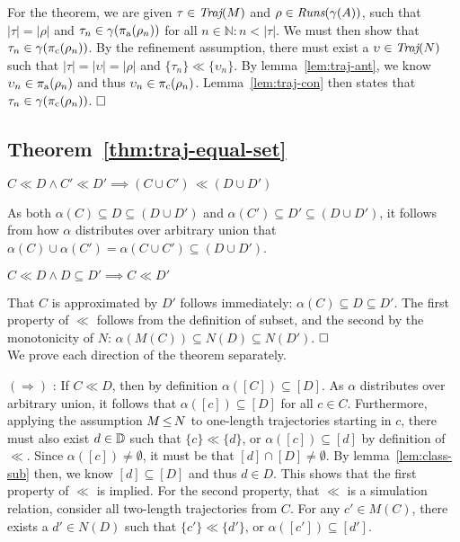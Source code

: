 
For the theorem, we are given $\tau \in \operatorname{\textit{Traj}}(M)$ and $\rho \in \operatorname{\textit{Runs}}(\gamma(A))$, such that $| \tau | = | \rho |$ and $\tau_{n} \in \gamma(\operatorname{\pi_{\textrm{a}}}(\rho_{n}))$ for all $n \in \mathbb{N} : n < | \tau |$. We must then show that $\tau_{n} \in \gamma(\operatorname{\pi_{\textrm{c}}}(\rho_{n}))$. By the refinement assumption, there must exist a $\upsilon \in \operatorname{\textit{Traj}}(N)$ such that $| \tau | = | \upsilon | = | \rho |$ and $\{ \tau_{n} \} \ll \{ \upsilon_{n} \}$. By lemma~\ref{lem:traj-ant}, we know $\upsilon_{n} \in \operatorname{\pi_{\textrm{a}}}(\rho_{n})$ and thus $\upsilon_{n} \in \operatorname{\pi_{\textrm{c}}}(\rho_{n})$. Lemma~\ref{lem:traj-con} then states that $\tau_{n} \in \gamma(\operatorname{\pi_{\textrm{c}}}(\rho_{n}))$. $\qedbox$

\subsection{Theorem~\ref{thm:traj-equal-set}}

\begin{lemma} \label{lem:name2}
$C \ll D \wedge C' \ll D' \implies (C \cup C') \, \ll (D \cup D')$
\end{lemma}

As both $\alpha(C) \subseteq D \subseteq (D \cup D')$ and $\alpha(C') \subseteq D' \subseteq (D \cup D')$, it follows from how $\alpha$ distributes over arbitrary union that $\alpha(C) \cup \alpha(C') = \alpha(C \cup C') \subseteq (D \cup D')$. \todo{\dots}

\begin{lemma} \label{lem:name1}
$C \ll D \wedge D \subseteq D' \implies C \ll D'$
\end{lemma}

That $C$ is approximated by $D'$ follows immediately: $\alpha(C) \subseteq D \subseteq D'$. The first property of $\ll$ follows from the definition of subset, and the second by the monotonicity of $N$: $\alpha(M(C)) \subseteq N(D) \subseteq N(D')$. $\qedbox$
\\

We prove each direction of the theorem separately.

$(\Rightarrow)$ : If $C \ll D$, then by definition $\alpha([C]) \subseteq [D]$. As $\alpha$ distributes over arbitrary union, it follows that $\alpha([c]) \subseteq [D]$ for all $c \in C$. Furthermore, applying the assumption $M \operatorname{\leq} N$ to one-length trajectories starting in $c$, there must also exist $d \in \mathbb{D}$ such that $\{ c \} \ll \{ d \}$, or $\alpha([c]) \subseteq [d]$ by definition of $\ll$. Since $\alpha([c]) \neq \emptyset$, it must be that $[d] \cap [D] \neq \emptyset$. By lemma~\ref{lem:class-sub} then, we know $[d] \subseteq [D]$ and thus $d \in D$. This shows that the first property of $\ll$ is implied. For the second property, that $\ll$ is a simulation relation, consider all two-length trajectories from $C$. For any $c' \in M(C)$, there exists a $d' \in N(D)$ such that $\{ c' \} \ll \{ d' \}$, or $\alpha([c']) \subseteq [d']$. \todo{\dots}


